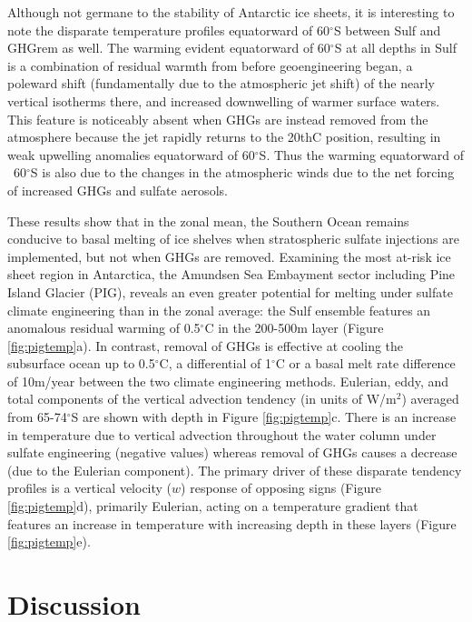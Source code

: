 \documentclass{nature}
\begin{document}
Although not germane to the stability of Antarctic ice sheets, it is interesting to note the disparate temperature profiles equatorward of 60$^\circ$S between Sulf and GHGrem as well. The warming evident equatorward of 60$^\circ$S at all depths in Sulf is a combination of residual warmth from before geoengineering began, a poleward shift (fundamentally due to the atmospheric jet shift) of the nearly vertical isotherms there, and increased downwelling of warmer surface waters. This feature is noticeably absent when GHGs are instead removed from the atmosphere because the jet rapidly returns to the 20thC position, resulting in weak upwelling anomalies equatorward of 60$^\circ$S. Thus the warming equatorward of ~60$^\circ$S is also due to the changes in the atmospheric winds due to the net forcing of increased GHGs and sulfate aerosols.

These results show that in the zonal mean, the Southern Ocean remains conducive to basal melting of ice shelves when stratospheric sulfate injections are implemented, but not when GHGs are removed. Examining the most at-risk ice sheet region in Antarctica, the Amundsen Sea Embayment sector including Pine Island Glacier (PIG), reveals an even greater potential for melting under sulfate climate engineering than in the zonal average: the Sulf ensemble features an anomalous residual warming of 0.5$^\circ$C in the 200-500m layer (Figure \ref{fig:pigtemp}a). In contrast, removal of GHGs is effective at cooling the subsurface ocean up to 0.5$^\circ$C, a differential of 1$^\circ$C or a basal melt rate difference of 10m/year between the two climate engineering methods. Eulerian, eddy, and total components of the vertical advection tendency (in units of W/m$^2$) averaged from 65-74$^\circ$S are shown with depth in Figure \ref{fig:pigtemp}c. There is an increase in temperature due to vertical advection throughout the water column under sulfate engineering (negative values) whereas removal of GHGs causes a decrease (due to the Eulerian component). The primary driver of these disparate tendency profiles is a vertical velocity ($w$) response of opposing signs (Figure \ref{fig:pigtemp}d), primarily Eulerian, acting on a temperature gradient that features an increase in temperature with increasing depth in these layers (Figure \ref{fig:pigtemp}e). 

\section{Discussion}
\end{document}
